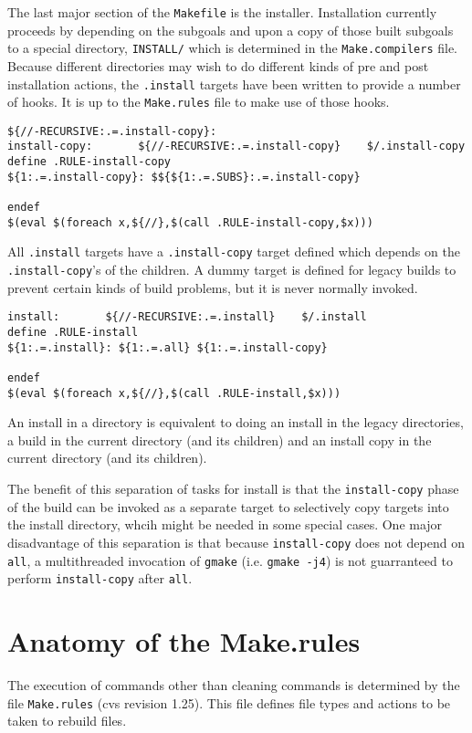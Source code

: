 \documentclass[letterpaper]{article}
\begin{document}
The last major section of the \verb+Makefile+ is the installer.
Installation currently proceeds by depending on the subgoals
and upon a copy of those built subgoals to a special directory,
\verb+INSTALL/+ which is determined in the \verb+Make.compilers+
file.  Because different directories may wish to do different
kinds of pre and post installation actions, the \verb+.install+
targets have been written to provide a number of hooks.  It is
up to the \verb+Make.rules+ file to make use of those hooks.

\begin{verbatim}
${//-RECURSIVE:.=.install-copy}:
install-copy:       ${//-RECURSIVE:.=.install-copy}    $/.install-copy
define .RULE-install-copy
${1:.=.install-copy}: $${${1:.=.SUBS}:.=.install-copy}

endef
$(eval $(foreach x,${//},$(call .RULE-install-copy,$x)))
\end{verbatim}
All \verb+.install+ targets have a \verb+.install-copy+ target defined
which depends on the \verb+.install-copy+'s of the children.  A dummy
target is defined for legacy builds to prevent certain kinds of
build problems, but it is never normally invoked.

\begin{verbatim}
install:       ${//-RECURSIVE:.=.install}    $/.install
define .RULE-install
${1:.=.install}: ${1:.=.all} ${1:.=.install-copy}

endef
$(eval $(foreach x,${//},$(call .RULE-install,$x)))
\end{verbatim}
An install in a directory is equivalent to doing an install in
the legacy directories, a build in the current directory (and
its children) and an install copy in the current directory
(and its children).

The benefit of this separation of tasks for install is that
the \verb+install-copy+ phase of the build can be invoked as a
separate target to selectively copy targets into the install
directory, whcih might be needed in some special cases.  One
major disadvantage of this separation is that because \verb+install-copy+
does not depend on \verb+all+, a multithreaded invocation of
\verb+gmake+ (i.e. \verb+gmake -j4+) is not guarranteed to perform
\verb+install-copy+ after \verb+all+.

\section{Anatomy of the Make.rules}

The execution of commands other than cleaning commands is determined
by the file \verb+Make.rules+ (cvs revision 1.25).  This file defines
file types and actions to be taken to rebuild files.
\end{document}

